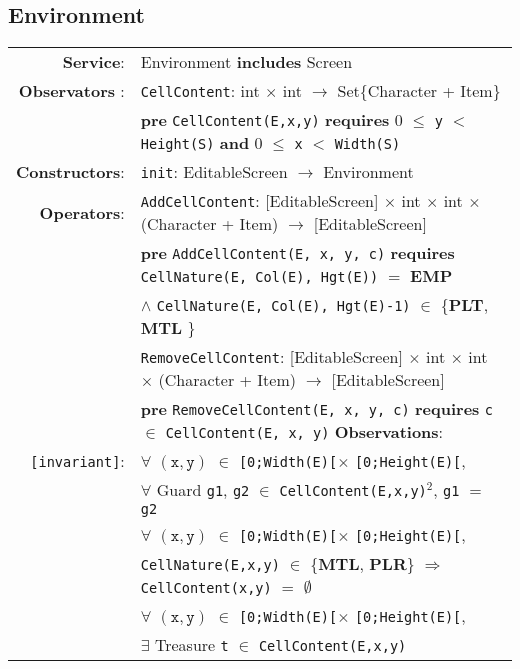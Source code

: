 \documentclass[8pt]{article}
\begin{document}
\subsection{Environment}

{\small
\begin{longtable}{rl}
  \textbf{Service}: & Environment \textbf{includes} Screen
  \\ \textbf{Observators} : & \texttt{CellContent}:
  \textrm{int} $\times$ \textrm{int} $\rightarrow$
  \textrm{Set\{Character + Item\}} \\
  & \quad \textbf{pre } \texttt{CellContent(E,x,y)} \textbf{ requires } 0 $\leq$ \texttt{y} $<$ \texttt{Height(S)} \textbf{ and } 0 $\leq$ \texttt{x} $<$ \texttt{Width(S)}\\
  \textbf{Constructors}: & \texttt{init}: \textrm{EditableScreen} $\rightarrow$ \textrm{Environment} \\
  \textbf{Operators}: & \texttt{AddCellContent}: \textrm{[EditableScreen]} $\times$ \textrm{int} $\times$ \textrm{int} $\times$ \textrm{(Character + Item)} $\rightarrow$ \textrm{[EditableScreen]}\\
  & \quad \textbf{pre} \texttt{AddCellContent(E, x, y, c)} \textbf{requires} \texttt{CellNature(E, Col(E), Hgt(E))} $=$ \textbf{EMP} \\ 
  & \quad\quad\quad $\land$ \texttt{CellNature(E, Col(E), Hgt(E)-1)} $\in$ \{\textbf{PLT}, \textbf{MTL}  \} \\
  & \texttt{RemoveCellContent}: \textrm{[EditableScreen]} $\times$ \textrm{int} $\times$ \textrm{int} $\times$ \textrm{(Character + Item)} $\rightarrow$ \textrm{[EditableScreen]} \\
  & \quad \textbf{pre} \texttt{RemoveCellContent(E, x, y, c)} \textbf{requires} \texttt{c} $\in$ \texttt{CellContent(E, x, y)}
  \textbf{Observations}: \\
  \texttt{[invariant]}: & $\forall$ $(\mathtt{x},\mathtt{y})$ $\in$ \texttt{[0;Width(E)[}$\times$ \texttt{[0;Height(E)[}, \\
  & \quad\quad $\forall$ \textrm{Guard} \texttt{g1}, \texttt{g2} $\in$ \texttt{CellContent(E,x,y)}$^2$, \texttt{g1} $=$ \texttt{g2} \\
  & $\forall$ $(\mathtt{x},\mathtt{y})$ $\in$ \texttt{[0;Width(E)[}$\times$ \texttt{[0;Height(E)[},~\\
  & \quad\quad \texttt{CellNature(E,x,y)} $\in$ \{\textbf{MTL}, \textbf{PLR}\} $\Rightarrow$ \texttt{CellContent(x,y)} $=$ $\emptyset$  \\
  & $\forall$ $(\mathtt{x},\mathtt{y})$ $\in$ \texttt{[0;Width(E)[}$\times$ \texttt{[0;Height(E)[},~\\ & \quad\quad $\exists$ \textrm{Treasure} \texttt{t} $\in$ \texttt{CellContent(E,x,y)}  \\

\end{longtable}}
\end{document}
